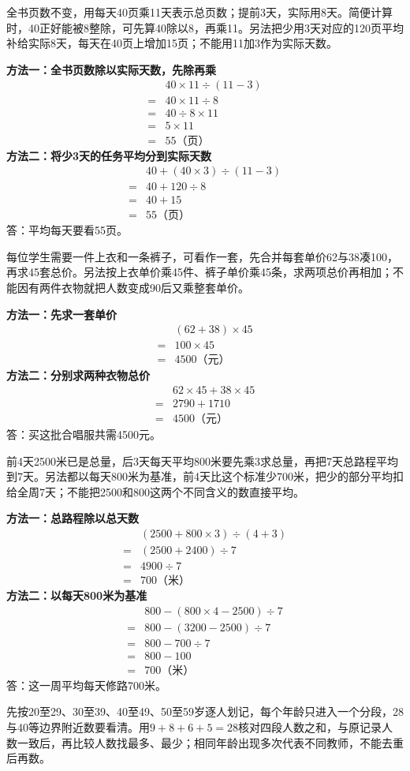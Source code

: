 \documentclass[multi=snippet,border=0pt]{standalone}
\newenvironment{snippet}[3]{\begin{minipage}{#1bp}\color{answerred}\fontsize{#2}{#3}\selectfont\raggedright}{\end{minipage}}
\begin{document}
\begin{snippet}{505}{11.5}{14}全书页数不变，用每天40页乘11天表示总页数；提前3天，实际用8天。简便计算时，40正好能被8整除，可先算40除以8，再乘11。另法把少用3天对应的120页平均补给实际8天，每天在40页上增加15页；不能用11加3作为实际天数。\par \textbf{方法一：全书页数除以实际天数，先除再乘}\[\begin{aligned}&40\times11\div(11-3)\\={}&40\times11\div8\\={}&40\div8\times11\\={}&5\times11\\={}&55\text{（页）}\end{aligned}\]\textbf{方法二：将少3天的任务平均分到实际天数}\[\begin{aligned}&40+(40\times3)\div(11-3)\\={}&40+120\div8\\={}&40+15\\={}&55\text{（页）}\end{aligned}\]答：平均每天要看55页。\end{snippet}
\begin{snippet}{505}{11.5}{14}每位学生需要一件上衣和一条裤子，可看作一套，先合并每套单价62与38凑100，再求45套总价。另法按上衣单价乘45件、裤子单价乘45条，求两项总价再相加；不能因有两件衣物就把人数变成90后又乘整套单价。\par \textbf{方法一：先求一套单价}\[\begin{aligned} &(62+38)\times45\\={}&100\times45\\={}&4500\text{（元）}\end{aligned}\]\textbf{方法二：分别求两种衣物总价}\[\begin{aligned} &62\times45+38\times45\\={}&2790+1710\\={}&4500\text{（元）}\end{aligned}\]答：买这批合唱服共需4500元。\end{snippet}
\begin{snippet}{505}{11.5}{14}前4天2500米已是总量，后3天每天平均800米要先乘3求总量，再把7天总路程平均到7天。另法都以每天800米为基准，前4天比这个标准少700米，把少的部分平均扣给全周7天；不能把2500和800这两个不同含义的数直接平均。\par \textbf{方法一：总路程除以总天数}\[\begin{aligned} &(2500+800\times3)\div(4+3)\\={}&(2500+2400)\div7\\={}&4900\div7\\={}&700\text{（米）}\end{aligned}\]\textbf{方法二：以每天800米为基准}\[\begin{aligned} &800-(800\times4-2500)\div7\\={}&800-(3200-2500)\div7\\={}&800-700\div7\\={}&800-100\\={}&700\text{（米）}\end{aligned}\]答：这一周平均每天修路700米。\end{snippet}
\begin{snippet}{505}{11.5}{14}先按20至29、30至39、40至49、50至59岁逐人划记，每个年龄只进入一个分段，28与40等边界附近数要看清。用\(9+8+6+5=28\)核对四段人数之和，与原记录人数一致后，再比较人数找最多、最少；相同年龄出现多次代表不同教师，不能去重后再数。\end{snippet}
\end{document}
